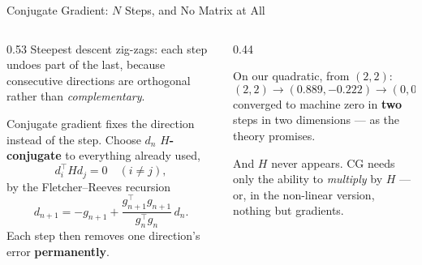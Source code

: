 \begin{frame}{Conjugate Gradient: $N$ Steps, and No Matrix at All}
\begin{columns}[T]
\begin{column}{0.53\textwidth}
\small
Steepest descent zig-zags: each step undoes part of the last, because consecutive directions are orthogonal rather than \emph{complementary}.
\medskip

Conjugate gradient fixes the direction instead of the step. Choose $d_n$ \textbf{$H$-conjugate} to everything already used,
\[
  d_i^{\!\top}Hd_j=0 \quad (i\neq j),
\]
by the Fletcher--Reeves recursion
\[
  d_{n+1}=-g_{n+1}+\frac{g_{n+1}^{\!\top}g_{n+1}}{g_n^{\!\top}g_n}\,d_n .
\]
Each step then removes one direction's error \textbf{permanently}.
\end{column}
\begin{column}{0.44\textwidth}
\begin{takeawaybox}[title=\textbf{Exact in $N$ steps}]\small
On our quadratic, from $(2,2)$:
\[
  (2,2)\to(0.889,-0.222)\to(0,0),
\]
converged to machine zero in \textbf{two} steps in two dimensions --- as the theory promises.
\end{takeawaybox}
\medskip
\begin{examplebox}\footnotesize
And $H$ never appears. CG needs only the ability to \emph{multiply} by $H$ --- or, in the non-linear version, nothing but gradients.
\end{examplebox}
\end{column}
\end{columns}
\vspace{1mm}
\end{frame}

